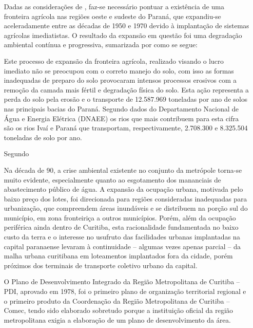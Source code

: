 	Dadas as considerações de , faz-se necessário pontuar a existência de uma fronteira agrícola nas regiões oeste e sudeste do Paraná, que expandiu-se aceleradamente entre as décadas de 1950 e 1970 devido à implantação de sistemas agrícolas imediatistas. O resultado da expansão em questão foi uma degradação ambiental contínua e progressiva, sumarizada por \cite[p. 3--4]{andreoli1999a} como se segue:
	
	\begin{citacao}
		Este processo de expansão da fronteira agrícola, realizado visando o lucro imediato não se preocupou com o correto manejo do solo, com isso as formas inadequadas de preparo do solo provocaram intensos processos erosivos com a remoção da camada mais fértil e degradação física do solo. Esta ação representa a perda do solo pela erosão e o transporte de 12.587.969 toneladas por ano de solos nas principais bacias do Paraná. Segundo dados do Departamento Nacional de Água e Energia Elétrica (DNAEE) os rios que mais contribuem para esta cifra são os rios Ivaí e Paraná que transportam, respectivamente, 2.708.300 e 8.325.504 toneladas de solo por ano.
	\end{citacao}
	
	
	Segundo 

	Na década de 90, a crise ambiental existente no conjunto da metrópole torna-se muito evidente, especialmente quanto ao esgotamento dos mananciais de abastecimento público de água. A expansão da ocupação urbana, motivada pelo baixo preço dos lotes, foi direcionada para regiões consideradas inadequadas para urbanização, que compreendem áreas inundáveis e se distribuem na porção sul do município, em zona fronteiriça a outros municípios. Porém, além da ocupação periférica ainda dentro de Curitiba, esta racionalidade fundamentada no baixo custo da terra e o interesse no usufruto das facilidades urbanas implantadas na capital paranaense levaram à continuidade – algumas vezes apenas parcial – da malha urbana curitibana em loteamentos implantados fora da cidade, porém próximos dos terminais de transporte coletivo urbano da capital.
	
	O Plano de Desenvolvimento Integrado da Região Metropolitana de Curitiba – PDI, aprovado em 1978, foi o primeiro plano de organização territorial regional e o primeiro produto da Coordenação da Região Metropolitana de Curitiba – Comec, tendo sido elaborado sobretudo porque a instituição oficial da região metropolitana exigia a elaboração de um plano de desenvolvimento da área.
	
